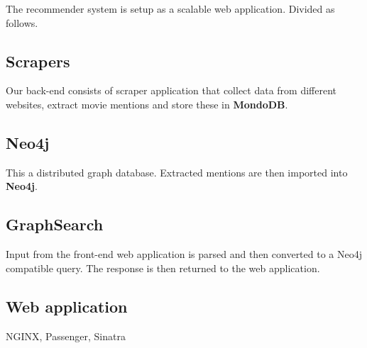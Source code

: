 The recommender system is setup as a scalable web application. Divided as follows.

\subsection{Scrapers}
\label{sec:arch:scrapers} 
Our back-end consists of scraper application that collect data from different websites, extract movie mentions and store these in \textbf{MondoDB}.  

\subsection{Neo4j}
\label{sec:arch:neo4j}
This a distributed graph database. Extracted mentions are then imported into \textbf{Neo4j}. 

\subsection{GraphSearch}
\label{sec:arch:graphsearch}
Input from the front-end web application is parsed and then converted to a Neo4j compatible query. The response is then returned to the web application.

\subsection{Web application}
\label{sec:arch:webapplication}

NGINX, Passenger, Sinatra

